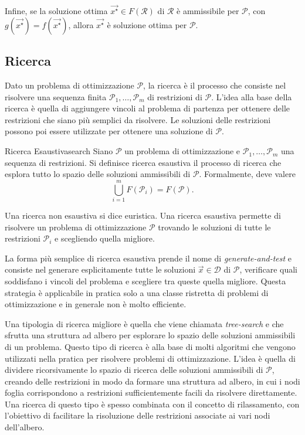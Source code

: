 Infine, se la soluzione ottima \( \vec{x^{\star}} \in F(\mathcal{R}) \) di \( \mathcal{R} \) è ammissibile per \(
\mathcal{P} \), con \( g(\vec{x^{\star}}) = f(\vec{x^{\star}}) \), allora \( \vec{x^{\star}} \) è soluzione ottima per
\( \mathcal{P} \).

\subsection{Ricerca}

Dato un problema di ottimizzazione \( \mathcal{P} \), la ricerca è il processo che consiste nel risolvere una sequenza
finita
\(
    \mathcal{P}_1, \ldots, \mathcal{P}_m
\)
di restrizioni di \( \mathcal{P} \). L'idea alla base della ricerca è quella di aggiungere vincoli al problema di
partenza per ottenere delle restrizioni che siano più semplici da risolvere. Le soluzioni
delle restrizioni possono poi essere utilizzate per ottenere una soluzione di \( \mathcal{P} \).

\begin{defbox}{Ricerca Esaustiva}{search}
    Siano \( \mathcal{P} \) un problema di ottimizzazione e \( \mathcal{P}_1, \ldots, \mathcal{P}_m \) una sequenza di
    restrizioni. Si definisce ricerca esaustiva il processo di ricerca che esplora tutto lo spazio delle soluzioni
    ammissibili di \( \mathcal{P} \). Formalmente, deve valere
    \[
        \bigcup_{i = 1}^m F(\mathcal{P}_i) = F(\mathcal{P}).
    \]
\end{defbox}
Una ricerca non esaustiva si dice euristica. Una ricerca esaustiva permette di risolvere un problema di ottimizzazione
\( \mathcal{P} \) trovando le soluzioni di tutte le restrizioni
\(
    \mathcal{P}_i
\)
e scegliendo quella migliore.

La forma più semplice di ricerca esaustiva prende il nome di \textit{generate-and-test} e consiste nel generare
esplicitamente tutte le soluzioni \( \vec{x} \in \mathcal{D} \) di \( \mathcal{P} \), verificare quali soddisfano i
vincoli del problema e scegliere tra queste quella migliore. Questa strategia è applicabile in pratica solo a una classe
ristretta di problemi di ottimizzazione e in generale non è molto efficiente.

Una tipologia di ricerca migliore è quella che viene chiamata \textit{tree-search} e che sfrutta una struttura ad albero
per esplorare lo spazio delle soluzioni ammissibili di un problema. Questo tipo di ricerca è alla base di molti
algoritmi che vengono utilizzati nella pratica per risolvere problemi di ottimizzazione. L'idea è quella di dividere
ricorsivamente lo spazio di ricerca delle soluzioni ammissibili di \( \mathcal{P} \), creando delle restrizioni in modo
da formare una struttura ad albero, in cui i nodi foglia corrispondono a restrizioni sufficientemente facili da
risolvere direttamente. Una ricerca di questo tipo è spesso combinata con il concetto di rilassamento, con l'obiettivo
di facilitare la risoluzione delle restrizioni associate ai vari nodi dell'albero.

